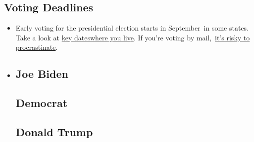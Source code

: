 \begin{itemize}
{  \subsection{Voting Deadlines}\label{voting-deadlines}}

  \begin{itemize}
  \item
    Early voting for the presidential election starts in September~in
    some states. Take a look at
    \href{https://www.nytimes3xbfgragh.onion/interactive/2019/us/elections/2020-presidential-election-calendar.html?action=click\&pgtype=Article\&state=default\&region=BELOW_MAIN_CONTENT\&context=storylines_guide}{key
    dates}\href{https://www.nytimes3xbfgragh.onion/interactive/2019/us/elections/2020-presidential-election-calendar.html?action=click\&pgtype=Article\&state=default\&region=BELOW_MAIN_CONTENT\&context=storylines_guide}{where
    you
    liv}\href{https://www.nytimes3xbfgragh.onion/interactive/2019/us/elections/2020-presidential-election-calendar.html?action=click\&pgtype=Article\&state=default\&region=BELOW_MAIN_CONTENT\&context=storylines_guide}{e}.
    If you're voting by
    mail,~\href{https://www.nytimes3xbfgragh.onion/interactive/2020/08/31/us/politics/vote-by-mail-deadlines.html?action=click\&pgtype=Article\&state=default\&region=BELOW_MAIN_CONTENT\&context=storylines_guide}{it's
    risky to procrastinate}.
  \item
    \href{https://www.nytimes3xbfgragh.onion/interactive/2020/us/elections/joe-biden.html?action=click\&pgtype=Article\&state=default\&region=BELOW_MAIN_CONTENT\&context=storylines_guide}{}

    \hypertarget{joe-biden}{%
    \section{Joe Biden}\label{joe-biden}}

    \hypertarget{democrat}{%
    \subsection{Democrat}\label{democrat}}

    \href{https://www.nytimes3xbfgragh.onion/interactive/2020/us/elections/donald-trump.html?action=click\&pgtype=Article\&state=default\&region=BELOW_MAIN_CONTENT\&context=storylines_guide}{}

    \hypertarget{donald-trump}{%
    \section{Donald Trump}\label{donald-trump}}


\end{itemize}
\end{itemize}
